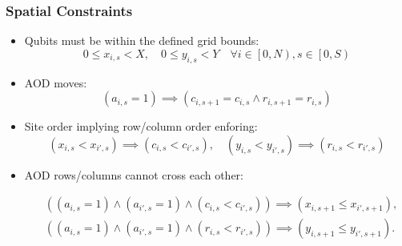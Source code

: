\documentclass[18 pt]{beamer}
\begin{document}
\begin{frame}
    \frametitle{Spatial Constraints}
        \begin{itemize}
            \item Qubits must be within the defined grid bounds:
            \[
            0 \leq x_{i,s} < X, \quad 0 \leq y_{i,s} < Y \quad \forall i\in \left[0,N \right), s \in \left[0,S\right)
            \]
            \item AOD moves:
            \[(a_{i,s}=1)\implies (c_{i,s+1}=c_{i,s}\land r_{i,s+1}=r_{i,s})\]
            \item Site order implying row/column order enforing:
            \[(x_{i,s}<x_{i',s})\implies (c_{i,s}<c_{i',s}),\quad (y_{i,s}<y_{i',s})\implies (r_{i,s}<r_{i',s})
            \] 
            \item AOD rows/columns cannot cross each other:
            \begin{small}
                \begin{align*}
                &((a_{i,s} = 1) \land (a_{i',s} = 1) \land (c_{i,s} < c_{i',s})) \implies (x_{i,s+1} \leq x_{i',s+1}), \\
                &((a_{i,s} = 1) \land (a_{i',s} = 1) \land (r_{i,s} < r_{i',s})) \implies (y_{i,s+1} \leq y_{i',s+1}).
                \end{align*}
            \end{small}
        \end{itemize}
\end{frame}
\end{document}
